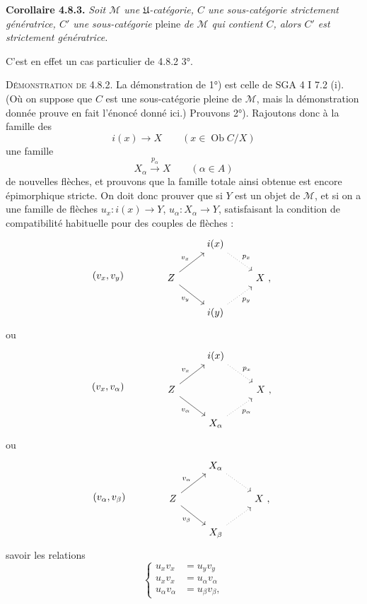 \documentclass[11pt]{article}
\newcommand{\printedpage}[1]{\marginpar{\footnotesize p.~#1}}
\newcommand{\msp}[1]{\marginpar{\footnotesize [#1]}}
\newcommand{\Ob}{\operatorname{Ob}}
\begin{document}
\textbf{Corollaire 4.8.3.} \textit{Soit $\mathcal{M}$ une $\mathfrak{U}$-catégorie, $C$ une sous-catégorie strictement génératrice, $C'$ une sous-catégorie} pleine \textit{de $\mathcal{M}$ qui contient $C$, alors $C'$ est strictement génératrice.}

C'est en effet un cas particulier de 4.8.2 3°.

\msp{page 194}

\textsc{Démonstration de 4.8.2}. La démonstration de 1°) est celle de SGA 4 I 7.2 (i). (Où on suppose que $C$ est une sous-catégorie pleine de $\mathcal{M}$, mais la démonstration donnée prouve en fait l'énoncé donné ici.) Prouvons 2°). Rajoutons donc à la famille des
\[ i(x) \longrightarrow X \qquad (x \in \Ob C/X) \]
une famille
\[ X_\alpha \xrightarrow{p_\alpha} X \qquad (\alpha \in A) \]
de nouvelles flèches, et prouvons que la famille totale ainsi obtenue est encore épimorphique stricte. On doit donc prouver que si $Y$ est un objet de $\mathcal{M}$, et si on a une famille de flèches $u_x : i(x) \longrightarrow Y$, $u_\alpha : X_\alpha \longrightarrow Y$, satisfaisant la condition de compatibilité habituelle pour des couples de flèches :
\[ (v_x,v_y) \qquad\qquad \begin{tikzcd}
& i(x) \arrow[dr, dotted, "p_x"] & \\
Z \arrow[ur, "v_x"] \arrow[dr, "v_y"'] & & X\ , \\
& i(y) \arrow[ur, dotted, "p_y"'] &
\end{tikzcd} \]
ou
\printedpage{68}
\[ (v_x,v_\alpha) \qquad\qquad \begin{tikzcd}
& i(x) \arrow[dr, dotted, "p_x"] & \\
Z \arrow[ur, "v_x"] \arrow[dr, "v_\alpha"'] & & X\ , \\
& X_\alpha \arrow[ur, dotted, "p_\alpha"'] &
\end{tikzcd} \]
\msp{page 195}
ou
\[ (v_\alpha,v_\beta) \qquad\qquad \begin{tikzcd}
& X_\alpha \arrow[dr, dotted] & \\
Z \arrow[ur, "v_\alpha"] \arrow[dr, "v_\beta"'] & & X\ , \\
& X_\beta \arrow[ur, dotted] &
\end{tikzcd} \]
savoir les relations
\[ \left\{\begin{aligned}
u_xv_x &= u_yv_y\\
u_xv_x &= u_\alpha v_\alpha\\
u_\alpha v_\alpha &= u_\beta v_\beta ,
\end{aligned}\right. \tag*{($*$)} \]
\end{document}
